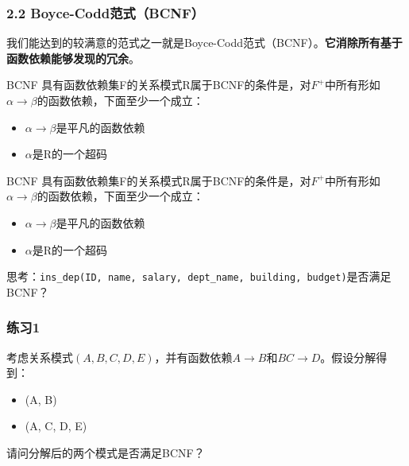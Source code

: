 \documentclass[aspectratio=169, 14pt]{beamer}
\begin{document}
\begin{frame}
	\frametitle{2.2 Boyce-Codd范式（BCNF）}
	我们能达到的较满意的范式之一就是\alert{Boyce-Codd范式}（BCNF）。\textbf{它消除所有基于函数依赖能够发现的冗余}。


	\begin{exampleblock}{BCNF}
		具有函数依赖集F的关系模式R属于BCNF的条件是，对$F^+$中所有形如$\alpha \rightarrow \beta$的函数依赖，下面至少一个成立：
		\begin{itemize}
			\item $\alpha \rightarrow \beta$是平凡的函数依赖
			\item $\alpha$是R的一个超码
		\end{itemize}

	\end{exampleblock}

\end{frame}

\begin{frame}

	\begin{exampleblock}{BCNF}
		具有函数依赖集F的关系模式R属于BCNF的条件是，对$F^+$中所有形如$\alpha \rightarrow \beta$的函数依赖，下面至少一个成立：
		\begin{itemize}
			\item $\alpha \rightarrow \beta$是平凡的函数依赖
			\item $\alpha$是R的一个超码
		\end{itemize}

	\end{exampleblock}

	 思考：\texttt{ins\_dep(ID, name, salary, dept\_name, building, budget)}是否满足BCNF？

\end{frame}

\begin{frame}
	\frametitle{练习1}
	考虑关系模式$(A, B, C, D, E)$，并有函数依赖$A \rightarrow B$和$BC \rightarrow D$。假设分解得到：

	\begin{itemize}
		\item (A, B)
		\item (A, C, D, E)
	\end{itemize}

	请问分解后的两个模式是否满足BCNF？


\end{frame}
\end{document}
